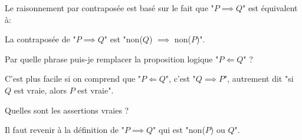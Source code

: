 \begin{question}

Le raisonnement par contraposée est basé
sur le fait que "$P \implies Q$" est équivalent à:
\begin{answers}



\end{answers}
\begin{explanations}
La contraposée de "$P \implies Q$" est "non($Q$) $\implies$ non($P$)".
\end{explanations}
\end{question}


\begin{question}

Par quelle phrase puis-je remplacer la proposition logique "$P \Longleftarrow Q$" ?
\begin{answers}



\end{answers}
\begin{explanations}
C'est plus facile si on comprend que "$P \Longleftarrow Q$", c'est "$Q \implies P$", autrement dit "si $Q$ est vraie, alors $P$ est vraie".
\end{explanations}
\end{question}


\begin{question}

Quelles sont les assertions vraies ?
\begin{answers}



\end{answers}
\begin{explanations}
Il faut revenir à la définition de "$P \implies Q$" qui est "non($P$) ou $Q$".
\end{explanations}
\end{question}


